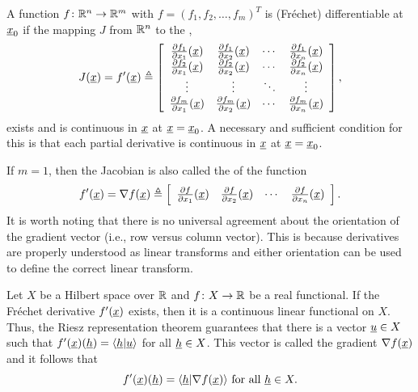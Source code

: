 \begin{example}
A function $f\colon \mathbb{R}^n \to \mathbb{R}^m$ with $f = (f_1,f_2,\ldots,f_m)^T$ is (Fr\'{e}chet) differentiable at $\underline{x}_0$ if the mapping $J$ from $\mathbb{R}^n$ to the ,
\[ J(\underline{x})=f'(\underline{x}) \triangleq \left[ \begin{array}{cccc} \frac{\partial  f_1}{\partial  x_1} (\underline{x}) & \frac{\partial  f_1}{\partial  x_2} (\underline{x}) & \cdots & \frac{\partial  f_1}{\partial  x_n} (\underline{x}) \\
\frac{\partial  f_2}{\partial  x_1} (\underline{x}) & \frac{\partial  f_2}{\partial  x_2} (\underline{x}) & \cdots & \frac{\partial  f_2}{\partial  x_n} (\underline{x}) \\
\vdots & \vdots & \ddots & \vdots \\
\frac{\partial  f_m}{\partial  x_1} (\underline{x}) & \frac{\partial  f_m}{\partial  x_2} (\underline{x}) & \cdots & \frac{\partial  f_m}{\partial  x_n} (\underline{x}) \end{array} \right], \]
exists and is continuous in $\underline{x}$ at $\underline{x}=\underline{x}_0$.
A necessary and sufficient condition for this is that each partial derivative is continuous in $\underline{x}$ at $\underline{x}=\underline{x}_0$.

If $m=1$, then the Jacobian is also called the  of the function
\[ f'(\underline{x}) = \nabla f(\underline{x}) \triangleq \left[ \begin{array}{cccc} \frac{\partial  f}{\partial  x_1} (\underline{x}) & \frac{\partial  f}{\partial  x_2} (\underline{x}) & \cdots & \frac{\partial  f}{\partial  x_n} (\underline{x}) \end{array} \right]. \]
It is worth noting that there is no universal agreement about the orientation of the gradient vector (i.e., row versus column vector).
This is because derivatives are properly understood as linear transforms and either orientation can be used to define the correct linear transform. 
\end{example}

\begin{example}
Let $X$ be a Hilbert space over $\mathbb{R}$ and $f\colon X \to \mathbb{R}$ be a real functional.
If the Fr\'{e}chet derivative $f'(\underline{x})$ exists, then it is a continuous linear functional on $X$.
Thus, the Riesz representation theorem guarantees that there is a vector $\underline{u} \in X$ such that
$ f'(\underline{x})(\underline{h}) = \langle\underline{h} | \underline{u} \rangle $ for all $\underline{h}\in X$.
This vector is called the gradient $\nabla f(\underline{x})$ and it follows that
$$ f'(\underline{x})(\underline{h}) = \langle\underline{h} | \nabla f (\underline{x}) \rangle \text{ for all } \underline{h}\in X. $$
\end{example}

